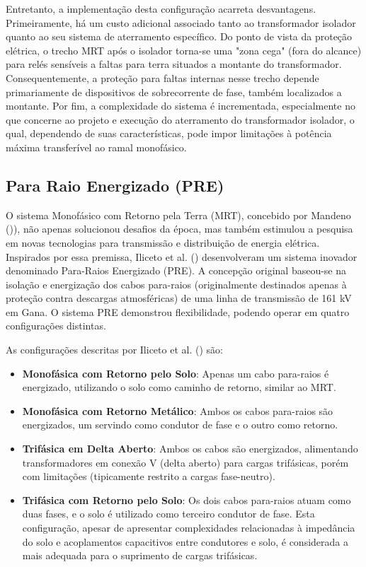 \documentclass[oneside,openright,12pt]{ufsm_2021} %
\begin{document}
\par Entretanto, a implementação desta configuração acarreta desvantagens. Primeiramente, há um custo adicional associado tanto ao transformador isolador quanto ao seu sistema de aterramento específico. Do ponto de vista da proteção elétrica, o trecho MRT após o isolador torna-se uma "zona cega" (fora do alcance) para relés sensíveis a faltas para terra situados a montante do transformador. Consequentemente, a proteção para faltas internas nesse trecho depende primariamente de dispositivos de sobrecorrente de fase, também localizados a montante. Por fim, a complexidade do sistema é incrementada, especialmente no que concerne ao projeto e execução do aterramento do transformador isolador, o qual, dependendo de suas características, pode impor limitações à potência máxima transferível ao ramal monofásico.

\subsection{Para Raio Energizado (PRE)}

\par O sistema Monofásico com Retorno pela Terra (MRT), concebido por Mandeno ()\citeyear{mandeno_rural_1947}), não apenas solucionou desafios da época, mas também estimulou a pesquisa em novas tecnologias para transmissão e distribuição de energia elétrica. Inspirados por essa premissa, Iliceto et al. (\citeyear{iliceto_new_1989}) desenvolveram um sistema inovador denominado Para-Raios Energizado (PRE). A concepção original baseou-se na isolação e energização dos cabos para-raios (originalmente destinados apenas à proteção contra descargas atmosféricas) de uma linha de transmissão de 161 kV em Gana. O sistema PRE demonstrou flexibilidade, podendo operar em quatro configurações distintas.

\par As configurações descritas por Iliceto et al. (\citeyear{iliceto_new_1989}) são:
\begin{itemize}
	\item \textbf{Monofásica com Retorno pelo Solo}: Apenas um cabo para-raios é energizado, utilizando o solo como caminho de retorno, similar ao MRT.
	\item \textbf{Monofásica com Retorno Metálico}: Ambos os cabos para-raios são energizados, um servindo como condutor de fase e o outro como retorno.
	\item \textbf{Trifásica em Delta Aberto}: Ambos os cabos são energizados, alimentando transformadores em conexão V (delta aberto) para cargas trifásicas, porém com limitações (tipicamente restrito a cargas fase-neutro).
	\item \textbf{Trifásica com Retorno pelo Solo}: Os dois cabos para-raios atuam como duas fases, e o solo é utilizado como terceiro condutor de fase. Esta configuração, apesar de apresentar complexidades relacionadas à impedância do solo e acoplamentos capacitivos entre condutores e solo, é considerada a mais adequada para o suprimento de cargas trifásicas.
\end{itemize}
\end{document}
